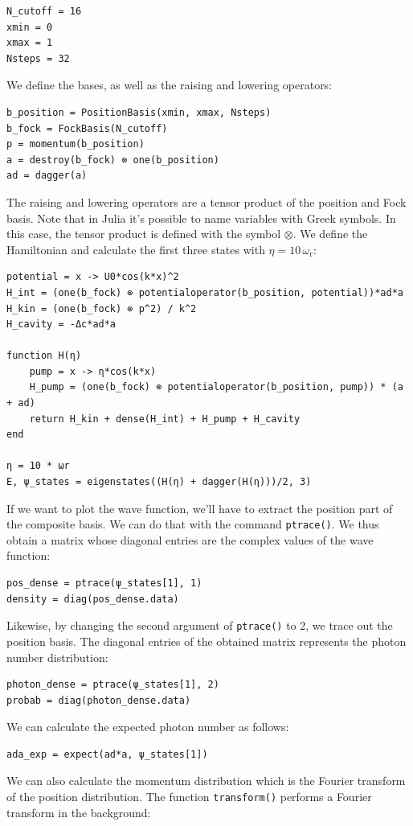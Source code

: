 \begin{lstlisting}
N_cutoff = 16
xmin = 0
xmax = 1
Nsteps = 32
\end{lstlisting}We define the bases, as well as the raising and lowering operators:

\begin{lstlisting}
b_position = PositionBasis(xmin, xmax, Nsteps)
b_fock = FockBasis(N_cutoff)
p = momentum(b_position)
a = destroy(b_fock) ⊗ one(b_position)
ad = dagger(a)
\end{lstlisting}The raising and lowering operators are a tensor product of the position and Fock basis. Note that in Julia it's possible to name variables with Greek symbols. In this case, the tensor product is defined with the symbol $\otimes$. We define the Hamiltonian and calculate the first three states with $\eta = 10 \, \omega_\text{r}$:

\begin{lstlisting}
potential = x -> U0*cos(k*x)^2
H_int = (one(b_fock) ⊗ potentialoperator(b_position, potential))*ad*a
H_kin = (one(b_fock) ⊗ p^2) / k^2
H_cavity = -Δc*ad*a

function H(η)
    pump = x -> η*cos(k*x)
    H_pump = (one(b_fock) ⊗ potentialoperator(b_position, pump)) * (a + ad)
    return H_kin + dense(H_int) + H_pump + H_cavity
end

η = 10 * ωr
E, ψ_states = eigenstates((H(η) + dagger(H(η)))/2, 3)
\end{lstlisting}If we want to plot the wave function, we'll have to extract the position part of the composite basis. We can do that with the command \texttt{ptrace()}. We thus obtain a matrix whose diagonal entries are the complex values of the wave function:

\begin{lstlisting}
pos_dense = ptrace(ψ_states[1], 1)
density = diag(pos_dense.data)
\end{lstlisting} Likewise, by changing the second argument of \texttt{ptrace()} to 2, we trace out the position basis. The diagonal entries of the obtained matrix represents the photon number distribution:

\begin{lstlisting}
photon_dense = ptrace(ψ_states[1], 2)
probab = diag(photon_dense.data)
\end{lstlisting}We can calculate the expected photon number as follows:

\begin{lstlisting}
ada_exp = expect(ad*a, ψ_states[1])
\end{lstlisting}We can also calculate the momentum distribution which is the Fourier transform of the position distribution. The function \texttt{transform()} performs a Fourier transform in the background:

